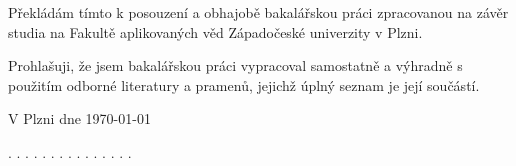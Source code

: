 
\begin{authorship_declaration}
\vspace{1cm}

\vspace*{0.1\textheight} 
Překládám tímto k posouzení a obhajobě bakalářskou práci zpracovanou na závěr studia na Fakultě aplikovaných věd Západočeské univerzity v Plzni. \par
Prohlašuji, že jsem bakalářskou práci vypracoval samostatně a výhradně s použitím odborné literatury a pramenů, jejichž úplný seznam je její součástí. 

\vfill
\begin{minipage}[t]{0.45\textwidth}
\begin{flushleft} 
V Plzni dne {\today}
\end{flushleft}
\end{minipage}
\begin{minipage}[t]{0.45\textwidth}
\begin{flushright}
. . . . . . . . . . . . . . . \\ 
\vspace{3mm}
{\authorname}
\end{flushright}
\end{minipage}\\[2.5cm]


\end{authorship_declaration}
\cleardoublepage